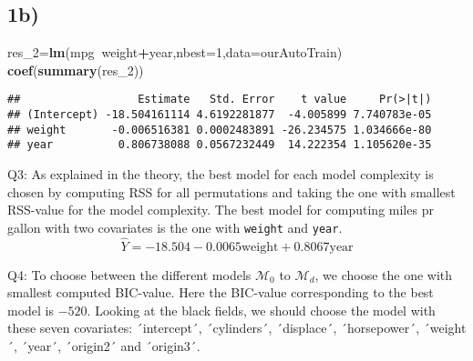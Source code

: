 \documentclass[]{article}
\newenvironment{Shaded}{\begin{snugshade}}{\end{snugshade}}
\newcommand{\KeywordTok}[1]{\textcolor[rgb]{0.13,0.29,0.53}{\textbf{#1}}}
\newcommand{\DataTypeTok}[1]{\textcolor[rgb]{0.13,0.29,0.53}{#1}}
\newcommand{\DecValTok}[1]{\textcolor[rgb]{0.00,0.00,0.81}{#1}}
\newcommand{\CommentTok}[1]{\textcolor[rgb]{0.56,0.35,0.01}{\textit{#1}}}
\newcommand{\OperatorTok}[1]{\textcolor[rgb]{0.81,0.36,0.00}{\textbf{#1}}}
\newcommand{\NormalTok}[1]{#1}
\begin{document}
\subsection{1b)}\label{b}

\begin{Shaded}
\begin{Highlighting}[]
\NormalTok{res_}\DecValTok{2}\NormalTok{=}\KeywordTok{lm}\NormalTok{(mpg}\OperatorTok{~}\NormalTok{weight}\OperatorTok{+}\NormalTok{year,}\DataTypeTok{nbest=}\DecValTok{1}\NormalTok{,}\DataTypeTok{data=}\NormalTok{ourAutoTrain)}
\KeywordTok{coef}\NormalTok{(}\KeywordTok{summary}\NormalTok{(res_}\DecValTok{2}\NormalTok{))}
\end{Highlighting}
\end{Shaded}

\begin{verbatim}
##                  Estimate   Std. Error    t value     Pr(>|t|)
## (Intercept) -18.504161114 4.6192281877  -4.005899 7.740783e-05
## weight       -0.006516381 0.0002483891 -26.234575 1.034666e-80
## year          0.806738088 0.0567232449  14.222354 1.105620e-35
\end{verbatim}

Q3: As explained in the theory, the best model for each model complexity
is chosen by computing RSS for all permutations and taking the one with
smallest RSS-value for the model complexity. The best model for
computing miles pr gallon with two covariates is the one with
\texttt{weight} and \texttt{year}. \[
\hat{Y} = -18.504-0.0065\text{weight}+0.8067\text{year}
\]

Q4: To choose between the different models \(\mathcal{M}_0\) to
\(\mathcal{M}_d\), we choose the one with smallest computed BIC-value.
Here the BIC-value corresponding to the best model is \(-520\). Looking
at the black fields, we should choose the model with these seven
covariates: ´intercept´, ´cylinders´, ´displace´, ´horsepower´,
´weight´, ´year´, ´origin2´ and ´origin3´.

\begin{Shaded}
\end{Shaded}
\end{document}
